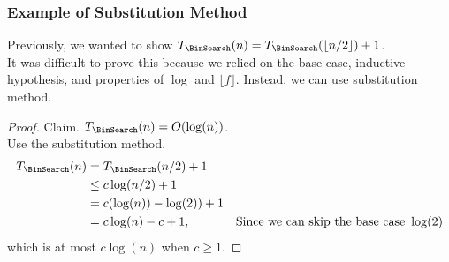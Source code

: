 \documentclass{article}
\begin{document}
\subsubsection{Example of Substitution Method}
Previously, we wanted to show $T_{\BinSearch}(n) = T_{\BinSearch}(\lfloor n/2\rfloor) + 1$.\\
It was difficult to prove this because we relied on the base case, inductive hypothesis, and properties of $\log$ and $\lfloor f \rfloor$. Instead, we can use substitution method.
\begin{proof}
Claim. $T_{\BinSearch}(n) = O(\log(n))$.\\
Use the substitution method.
\begin{align*}
    T_{\BinSearch}(n) & = T_{\BinSearch}(n/2) + 1\\
    & \leq c \log(n/2) + 1\\
    & = c (\log(n)) - \log(2)) + 1\\
    & = c \log(n) - c + 1, & \text{Since we can skip the base case }\log(2)
    \end{align*}
    which is at most $c \log(n)$ when $c \geq 1$.
\end{proof}
\end{document}
